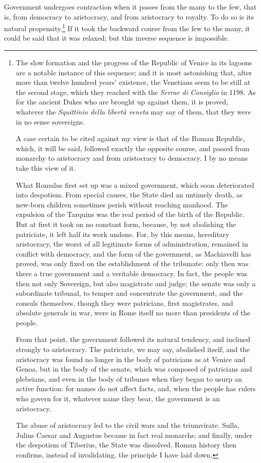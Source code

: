 \documentclass[12pt]{report}
\begin{document}
Government undergoes contraction when it passes from the many to the few, that is, from democracy to aristocracy, and from aristocracy to royalty. To do so is its natural propensity.\footnote{The slow formation and the progress of the Republic of Venice in its lagoons are a notable instance of this sequence; and it is most astonishing that, after more than twelve hundred years' existence, the Venetians seem to be still at the second stage, which they reached with the \textit{Serrar di Consiglio} in 1198. As for the ancient Dukes who are brought up against them, it is proved, whatever the \textit{Squittinio della libertà veneta} may say of them, that they were in no sense sovereigns.

A case certain to be cited against my view is that of the Roman Republic, which, it will be said, followed exactly the opposite course, and passed from monarchy to aristocracy and from aristocracy to democracy. I by no means take this view of it.

What Romulus first set up was a mixed government, which soon deteriorated into despotism. From special causes, the State died an untimely death, as new-born children sometimes perish without reaching manhood. The expulsion of the Tarquins was the real period of the birth of the Republic. But at first it took on no constant form, because, by not abolishing the patriciate, it left half its work undone. For, by this means, hereditary aristocracy, the worst of all legitimate forms of administration, remained in conflict with democracy, and the form of the government, as Machiavelli has proved, was only fixed on the establishment of the tribunate: only then was there a true government and a veritable democracy. In fact, the people was then not only Sovereign, but also magistrate and judge; the senate was only a subordinate tribunal, to temper and concentrate the government, and the consuls themselves, though they were patricians, first magistrates, and absolute generals in war, were in Rome itself no more than presidents of the people.

From that point, the government followed its natural tendency, and inclined strongly to aristocracy. The patriciate, we may say, abolished itself, and the aristocracy was found no longer in the body of patricians as at Venice and Genoa, but in the body of the senate, which was composed of patricians and plebeians, and even in the body of tribunes when they began to usurp an active function: for names do not affect facts, and, when the people has rulers who govern for it, whatever name they bear, the government is an aristocracy.

The abuse of aristocracy led to the civil wars and the triumvirate. Sulla, Julius Caesar and Augustus became in fact real monarchs; and finally, under the despotism of Tiberius, the State was dissolved. Roman history then confirms, instead of invalidating, the principle I have laid down.} If it took the backward course from the few to the many, it could be said that it was relaxed; but this inverse sequence is impossible.
\end{document}
